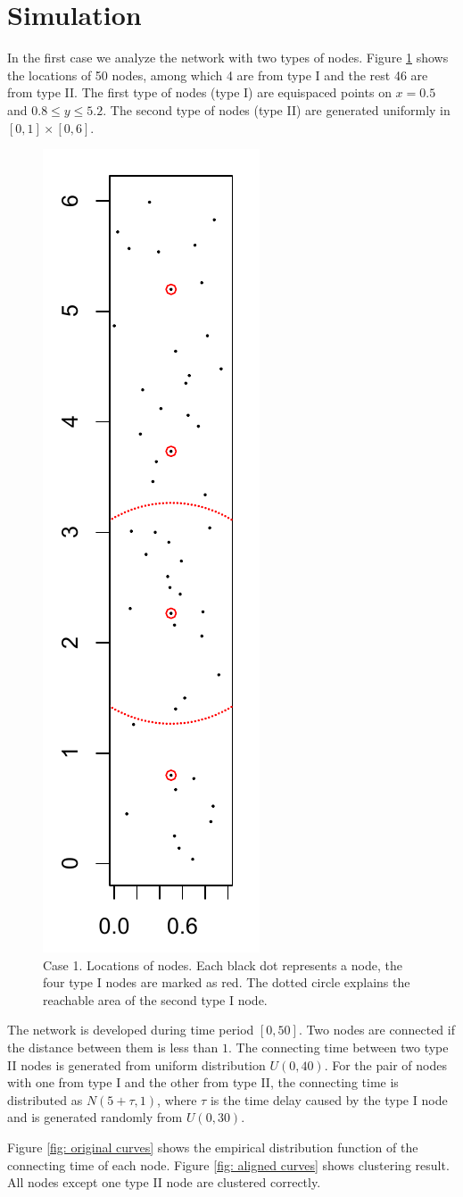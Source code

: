 
\section{Simulation} \label{sec:simulation}

In the first case we analyze the network with two types of nodes.
Figure \ref{fig: nodes locations} shows the locations of 50 nodes, among which 4 are from type I and the rest 46 are from type II.
The first type of nodes (type I) are equispaced points on $x=0.5$ and $0.8\leq y\leq 5.2$.
The second type of nodes (type II) are generated uniformly in $[0,1]\times[0,6]$. 
\\
\begin{figure}[htbp]
\includegraphics[width=.2\linewidth]{../simulation/plots/nodes_1_108}
\caption{Case 1. Locations of nodes. Each black dot represents a node, the four type I nodes are marked as red. The dotted circle explains the reachable area of the second type I node. }
\label{fig: nodes locations}
\end{figure}

\noindent
The network is developed during time period $[0,50]$.
Two nodes are connected if the distance between them is less than $1$.
The connecting time between two type II nodes is generated from uniform distribution $U(0,40)$.
For the pair of nodes with one from type I and the other from type II, the connecting time is distributed as $N(5+\tau,1)$, where $\tau$ is the time delay caused by the type I node and is generated randomly from $U(0,30)$.

\noindent
Figure \ref{fig: original curves} shows the empirical distribution function of the connecting time of each node.
Figure \ref{fig: aligned curves} shows clustering result. All nodes except one type II node are clustered correctly.


